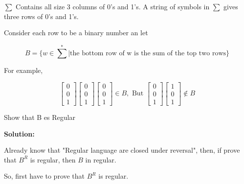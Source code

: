 \documentclass[9pt,tikz,border=2mm]{article}
\begin{document}
\begin{enumerate}
\begin{enumerate}
            $\sum$ Contains all size 3 columns of 0's and 1's. A string of symbols in $\sum$ gives three rows of 0's and 1's.

            Consider each row to be a binary number an let

            \[B = \{w \in \sum^* | \text{the bottom row of w is the sum of the top two rows}\}\]
        
            For example,

            \[
                \begin{bmatrix}
                    0\\
                    0\\
                    1
                \end{bmatrix}
                \begin{bmatrix}
                    0\\
                    0\\
                    1
                \end{bmatrix}
                \begin{bmatrix}
                    0\\
                    0\\
                    1
                \end{bmatrix}
                \in B,\text{  But }
                \begin{bmatrix}
                    0\\
                    0\\
                    1
                \end{bmatrix}
                \begin{bmatrix}
                    1\\
                    0\\
                    1
                \end{bmatrix}
                \notin B
            \]

            Show that B es Regular

            \textbf{Solution:}

            Already know that "Regular language are closed under reversal", then, if prove that $B^R$ is regular, then $B$ in regular.

            So, first have to prove that $B^R$ is regular.


\end{enumerate}
\end{enumerate}
\end{document}
